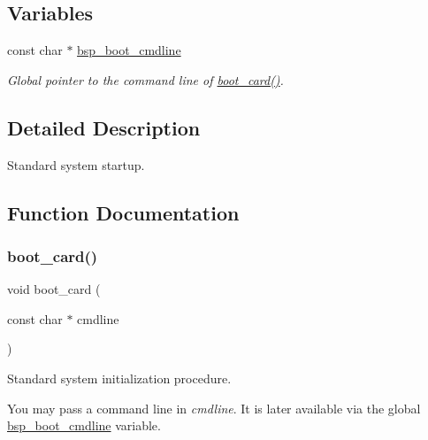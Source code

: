 \subsection*{Variables}
\begin{DoxyCompactItemize}
\item 
\mbox{\label{group__RTEMSBSPsSharedStartup_ga448d99a4be2aee9a0b591a1e039661b9}} 
const char $\ast$ \mbox{\hyperlink{group__RTEMSBSPsSharedStartup_ga448d99a4be2aee9a0b591a1e039661b9}{bsp\+\_\+boot\+\_\+cmdline}}
\begin{DoxyCompactList}\small\item\em Global pointer to the command line of \mbox{\hyperlink{group__RTEMSBSPsSharedStartup_gad8a18766fa4f3cf67d8f8ff8938008e0}{boot\+\_\+card()}}. \end{DoxyCompactList}\end{DoxyCompactItemize}


\subsection{Detailed Description}
Standard system startup. 



\subsection{Function Documentation}
\mbox{\label{group__RTEMSBSPsSharedStartup_gad8a18766fa4f3cf67d8f8ff8938008e0}} 
\subsubsection{\texorpdfstring{boot\_card()}{boot\_card()}}
{\footnotesize\ttfamily void boot\+\_\+card (\begin{DoxyParamCaption}\item[{const char $\ast$}]{cmdline }\end{DoxyParamCaption})}



Standard system initialization procedure. 

You may pass a command line in {\itshape cmdline}. It is later available via the global \mbox{\hyperlink{group__RTEMSBSPsSharedStartup_ga448d99a4be2aee9a0b591a1e039661b9}{bsp\+\_\+boot\+\_\+cmdline}} variable.

